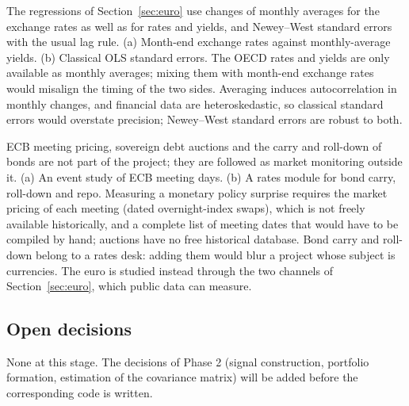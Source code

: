 {The regressions of Section~\ref{sec:euro} use changes of monthly averages for the exchange rates as well as for rates and yields, and Newey--West standard errors with the usual lag rule.}
{(a) Month-end exchange rates against monthly-average yields. (b) Classical OLS standard errors.}
{The OECD rates and yields are only available as monthly averages; mixing them with month-end exchange rates would misalign the timing of the two sides. Averaging induces autocorrelation in monthly changes, and financial data are heteroskedastic, so classical standard errors would overstate precision; Newey--West standard errors are robust to both.}

{ECB meeting pricing, sovereign debt auctions and the carry and roll-down of bonds are not part of the project; they are followed as market monitoring outside it.}
{(a) An event study of ECB meeting days. (b) A rates module for bond carry, roll-down and repo.}
{Measuring a monetary policy surprise requires the market pricing of each meeting (dated overnight-index swaps), which is not freely available historically, and a complete list of meeting dates that would have to be compiled by hand; auctions have no free historical database. Bond carry and roll-down belong to a rates desk: adding them would blur a project whose subject is currencies. The euro is studied instead through the two channels of Section~\ref{sec:euro}, which public data can measure.}

\subsection*{Open decisions}
None at this stage. The decisions of Phase 2 (signal construction, portfolio formation, estimation of the covariance matrix) will be added before the corresponding code is written.
